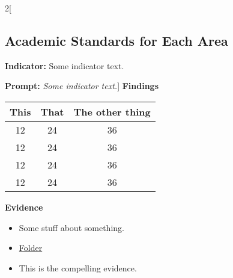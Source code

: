 \documentclass{report}
\begin{document}
\begin{paracol}{2}[\subsection{Academic Standards for Each Area}
\noindent\textbf{Indicator:} Some indicator text.

\noindent\textbf{Prompt:} \textit{Some indicator text.}]
\noindent\textbf{Findings}

\blindtext


\begin{table}[!h]
\begin{tabular}{c | c || c}
This & That & The other thing \\
\hline
12   &  24  &  36 \\
12   &  24  &  36 \\
12   &  24  &  36 \\
12   &  24  &  36 \\
\end{tabular}
\end{table}

\switchcolumn
\noindent\textbf{Evidence}
\vspace{-\topsep}

\begin{itemize}[leftmargin=*]
\setlength{\parskip}{0pt}
\setlength{\itemsep}{0pt plus 1pt}
\item Some stuff about something.
\item \href{https://drive.google.com/a/cmis.ac.th/folderview?id=0ByVFfrm0zfolWE0yenprdktGVlk&usp=sharing}{Folder}
\item This is the compelling evidence.
\end{itemize}

\end{paracol}
\end{document}
